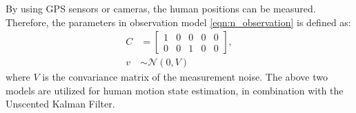 \documentclass[letterpaper, 10 pt, conference]{ieeeconf}
\begin{document}
	By using GPS sensors or cameras, the human positions can be measured.
	Therefore, the parameters in observation model \cref{eqn:n_observation} is defined as:
	\begin{subequations}
		\begin{align}
		C&=\left[
		\begin{array}{ccccc}
		1& 0& 0& 0& 0\\
		0& 0& 1& 0& 0
		\end{array}\right],\label{eqn:C}\\
		v&\sim\mathcal{N}(0,V)\label{eqn:meas_noise}
		\end{align}
	\end{subequations}
	where $V$ is the convariance matrix of the measurement noise.
	The above two models are utilized for human motion state estimation, in combination with the Unscented Kalman Filter.
	
	
	
\end{document}
